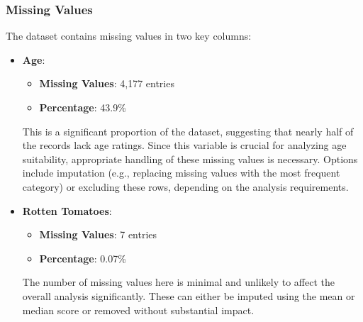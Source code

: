 \subsubsection{Missing Values}

The dataset contains missing values in two key columns:

\begin{itemize}
    \item \textbf{Age}: 
    \begin{itemize}
        \item \textbf{Missing Values}: 4,177 entries
        \item \textbf{Percentage}: 43.9\%
    \end{itemize}
    This is a significant proportion of the dataset, suggesting that nearly half of the records lack age ratings. Since this variable is crucial for analyzing age suitability, appropriate handling of these missing values is necessary. Options include imputation (e.g., replacing missing values with the most frequent category) or excluding these rows, depending on the analysis requirements.

    \item \textbf{Rotten Tomatoes}:
    \begin{itemize}
        \item \textbf{Missing Values}: 7 entries
        \item \textbf{Percentage}: 0.07\%
    \end{itemize}
    The number of missing values here is minimal and unlikely to affect the overall analysis significantly. These can either be imputed using the mean or median score or removed without substantial impact.
\end{itemize}
